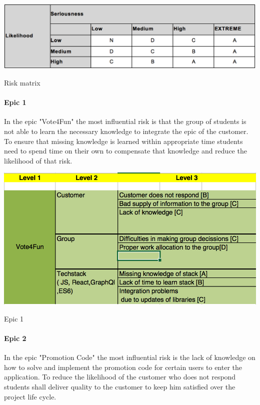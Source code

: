 \begin{table}[H]
  \includegraphics[width=\linewidth]{images/diagrams/risk_grading.png}
  \caption{Risk matrix}
\end{table}

\paragraph{Epic 1}
In the epic "Vote4Fun" the most influential risk is that the group of students is not able to learn the necessary knowledge to integrate the epic of the customer. 
\newline
To ensure that missing knowledge is learned within appropriate time students need to spend time on their own to compensate that knowledge and reduce the likelihood of that risk.

\begin{table}[H]
  \includegraphics[width=\linewidth]{images/diagrams/vote4fun.png}
  \caption{Epic 1}
\end{table}

\paragraph{Epic 2}
In the epic "Promotion Code" the most influential risk is the lack of knowledge on how to solve and implement the promotion code for certain users to enter the application. 
\newline
To reduce the likelihood of the customer who does not respond students shall deliver quality to the customer to keep him satisfied over the project life cycle.

